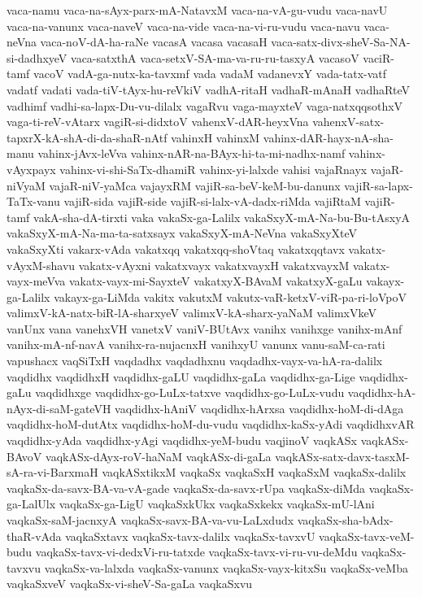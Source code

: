 {vaca-namu
vaca-na-sAyx-parx-mA-NatavxM
vaca-na-vA-gu-vudu
vaca-navU
vaca-na-vanunx
vaca-naveV
vaca-na-vide
vaca-na-vi-ru-vudu
vaca-navu
vaca-neVna
vaca-noV-dA-ha-raNe
vacasA
vacasa
vacasaH
vaca-satx-divx-sheV-Sa-NA-si-dadhxyeV
vaca-satxthA
vaca-setxV-SA-ma-va-ru-ru-tasxyA
vacasoV
vaciR-tamf
vacoV
vadA-ga-nutx-ka-tavxmf
vada
vadaM
vadanevxY
vada-tatx-vatf
vadatf
vadati
vada-tiV-tAyx-hu-reVkiV
vadhA-ritaH
vadhaR-mAnaH
vadhaRteV
vadhimf
vadhi-sa-lapx-Du-vu-dilalx
vagaRvu
vaga-mayxteV
vaga-natxqqsothxV
vaga-ti-reV-vAtarx
vagiR-si-didxtoV
vahenxV-dAR-heyxVna
vahenxV-satx-tapxrX-kA-shA-di-da-shaR-nAtf
vahinxH
vahinxM
vahinx-dAR-hayx-nA-sha-manu
vahinx-jAvx-leVva
vahinx-nAR-na-BAyx-hi-ta-mi-nadhx-namf
vahinx-vAyxpayx
vahinx-vi-shi-SaTx-dhamiR
vahinx-yi-lalxde
vahisi
vajaRnayx
vajaR-niVyaM
vajaR-niV-yaMca
vajayxRM
vajiR-sa-beV-keM-bu-danunx
vajiR-sa-lapx-TaTx-vanu
vajiR-sida
vajiR-side
vajiR-si-lalx-vA-dadx-riMda
vajiRtaM
vajiR-tamf
vakA-sha-dA-tirxti
vaka
vakaSx-ga-Lalilx
vakaSxyX-mA-Na-bu-Bu-tAsxyA
vakaSxyX-mA-Na-ma-ta-satxsayx
vakaSxyX-mA-NeVna
vakaSxyXteV
vakaSxyXti
vakarx-vAda
vakatxqq
vakatxqq-shoVtaq
vakatxqqtavx
vakatx-vAyxM-shavu
vakatx-vAyxni
vakatxvayx
vakatxvayxH
vakatxvayxM
vakatx-vayx-meVva
vakatx-vayx-mi-SayxteV
vakatxyX-BAvaM
vakatxyX-gaLu
vakayx-ga-Lalilx
vakayx-ga-LiMda
vakitx
vakutxM
vakutx-vaR-ketxV-viR-pa-ri-loVpoV
valimxV-kA-natx-biR-lA-sharxyeV
valimxV-kA-sharx-yaNaM
valimxVkeV
vanUnx
vana
vanehxVH
vanetxV
vaniV-BUtAvx
vanihx
vanihxge
vanihx-mAnf
vanihx-mA-nf-navA
vanihx-ra-nujacnxH
vanihxyU
vanunx
vanu-saM-ca-rati
vapushacx
vaqSiTxH
vaqdadhx
vaqdadhxnu
vaqdadhx-vayx-va-hA-ra-dalilx
vaqdidhx
vaqdidhxH
vaqdidhx-gaLU
vaqdidhx-gaLa
vaqdidhx-ga-Lige
vaqdidhx-gaLu
vaqdidhxge
vaqdidhx-go-LuLx-tatxve
vaqdidhx-go-LuLx-vudu
vaqdidhx-hA-nAyx-di-saM-gateVH
vaqdidhx-hAniV
vaqdidhx-hArxsa
vaqdidhx-hoM-di-dAga
vaqdidhx-hoM-dutAtx
vaqdidhx-hoM-du-vudu
vaqdidhx-kaSx-yAdi
vaqdidhxvAR
vaqdidhx-yAda
vaqdidhx-yAgi
vaqdidhx-yeM-budu
vaqjinoV
vaqkASx
vaqkASx-BAvoV
vaqkASx-dAyx-roV-haNaM
vaqkASx-di-gaLa
vaqkASx-satx-davx-tasxM-sA-ra-vi-BarxmaH
vaqkASxtikxM
vaqkaSx
vaqkaSxH
vaqkaSxM
vaqkaSx-dalilx
vaqkaSx-da-savx-BA-va-vA-gade
vaqkaSx-da-savx-rUpa
vaqkaSx-diMda
vaqkaSx-ga-LalUlx
vaqkaSx-ga-LigU
vaqkaSxkUkx
vaqkaSxkekx
vaqkaSx-mU-lAni
vaqkaSx-saM-jacnxyA
vaqkaSx-savx-BA-va-vu-LaLxdudx
vaqkaSx-sha-bAdx-thaR-vAda
vaqkaSxtavx
vaqkaSx-tavx-dalilx
vaqkaSx-tavxvU
vaqkaSx-tavx-veM-budu
vaqkaSx-tavx-vi-dedxVi-ru-tatxde
vaqkaSx-tavx-vi-ru-vu-deMdu
vaqkaSx-tavxvu
vaqkaSx-va-lalxda
vaqkaSx-vanunx
vaqkaSx-vayx-kitxSu
vaqkaSx-veMba
vaqkaSxveV
vaqkaSx-vi-sheV-Sa-gaLa
vaqkaSxvu
}
